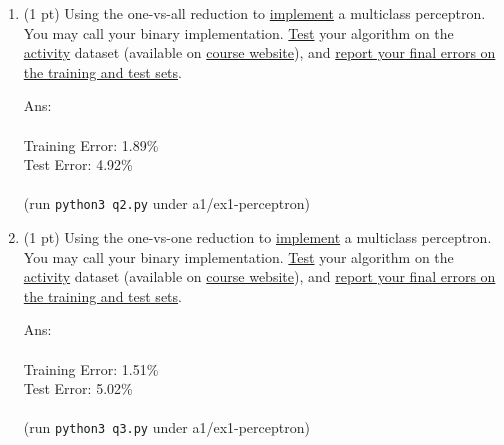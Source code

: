 \documentclass[10pt]{article}
\newcommand{\ans}[1]{{\color{orange}\textsf{Ans}: #1}}
\begin{document}
\begin{exercise}
\begin{enumerate}
    \item (1 pt) Using the one-vs-all reduction to \uline{implement} a multiclass perceptron. You may call your binary implementation. \uline{Test} your algorithm on the \href{https://archive-beta.ics.uci.edu/ml/datasets/human+activity+recognition+using+smartphones}{activity} dataset (available on \href{https://cs.uwaterloo.ca/~y328yu/mycourses/480/assignment.html}{course website}), and \uline{report your final errors on the training and test sets}.

          \ans\\
          \leavevmode\\
          Training Error: 1.89\%\\
          Test Error: 4.92\%\\
          \leavevmode\\
          (run \texttt{python3 q2.py} under a1/ex1-perceptron)
          {\vskip0.5cm}

    \item (1 pt) Using the one-vs-one reduction to \uline{implement} a multiclass perceptron. You may call your binary implementation. \uline{Test} your algorithm on the \href{https://archive-beta.ics.uci.edu/ml/datasets/human+activity+recognition+using+smartphoness}{activity} dataset (available on \href{https://cs.uwaterloo.ca/~y328yu/mycourses/480/assignment.html}{course website}), and \uline{report your final errors on the training and test sets}.

          \ans\\
          \leavevmode\\
          Training Error: 1.51\%\\
          Test Error: 5.02\%\\
          \leavevmode\\
          (run \texttt{python3 q3.py} under a1/ex1-perceptron)
          {\vskip0.5cm}


\end{enumerate}
\end{exercise}
\end{document}
